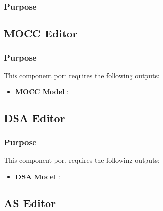 \documentclass{gemoc} %
\begin{document}

\subsubsection{Purpose}



\subsection{MOCC Editor}


\subsubsection{Purpose}


This component port requires the following outputs:
\begin{itemize}
  \item \textbf{MOCC Model} :
\end{itemize}

\subsection{DSA Editor}


\subsubsection{Purpose}


This component port requires the following outputs:
\begin{itemize}
  \item \textbf{DSA Model} :
\end{itemize}

\subsection{AS Editor}
\end{document}
